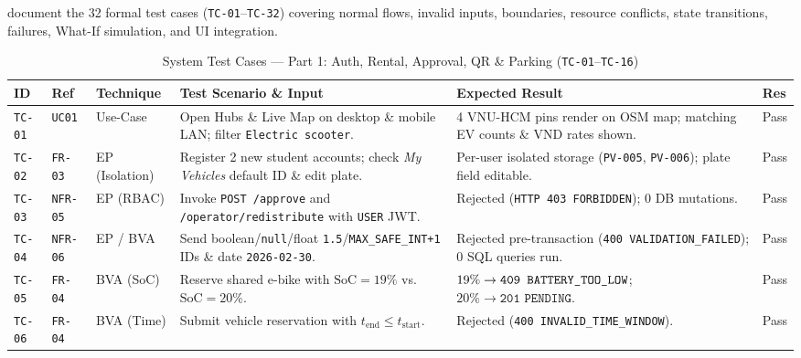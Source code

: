 \label{subsec:test-cases}
 document the 32 formal test cases (\texttt{TC-01}--\texttt{TC-32}) covering normal flows, invalid inputs, boundaries, resource conflicts, state transitions, failures, What-If simulation, and UI integration.

\begin{table}[H]
  \centering
  \singlespacing\scriptsize
  \caption{System Test Cases --- Part 1: Auth, Rental, Approval, QR \& Parking (\texttt{TC-01}--\texttt{TC-16})}
  \label{tab:tc-part1}
  \renewcommand{\arraystretch}{1.20}
  \begin{tabularx}{\textwidth}{|C{1.25cm}|C{1.40cm}|L{1.95cm}|Y|L{3.95cm}|C{0.95cm}|}
    \hline
    \textbf{ID} & \textbf{Ref} & \textbf{Technique} & \textbf{Test Scenario \& Input} & \textbf{Expected Result} & \textbf{Res} \\
    \hline
    \texttt{TC-01} & \texttt{UC01} & Use-Case & Open Hubs \& Live Map on desktop \& mobile LAN; filter \texttt{Electric scooter}. & 4 VNU-HCM pins render on OSM map; matching EV counts \& VND rates shown. & Pass \\
    \hline
    \texttt{TC-02} & \texttt{FR-03} & EP (Isolation) & Register 2 new student accounts; check \textit{My Vehicles} default ID \& edit plate. & Per-user isolated storage (\texttt{PV-005}, \texttt{PV-006}); plate field editable. & Pass \\
    \hline
    \texttt{TC-03} & \texttt{NFR-05} & EP (RBAC) & Invoke \texttt{POST /approve} and \texttt{/operator/\allowbreak redistribute} with \texttt{USER} JWT. & Rejected (\texttt{HTTP 403 FORBIDDEN}); 0 DB mutations. & Pass \\
    \hline
    \texttt{TC-04} & \texttt{NFR-06} & EP / BVA & Send boolean/\texttt{null}/float \texttt{1.5}/\texttt{MAX\_\allowbreak SAFE\_\allowbreak INT+1} IDs \& date \texttt{2026-02-30}. & Rejected pre-transaction (\texttt{400 VALIDATION\_\allowbreak FAILED}); 0 SQL queries run. & Pass \\
    \hline
    \texttt{TC-05} & \texttt{FR-04} & BVA (SoC) & Reserve shared e-bike with $\text{SoC}=19\%$ vs.\ $\text{SoC}=20\%$. & $19\% \rightarrow \texttt{409 BATTERY\_\allowbreak TOO\_\allowbreak LOW}$; $20\% \rightarrow \texttt{201 PENDING}$. & Pass \\
    \hline
    \texttt{TC-06} & \texttt{FR-04} & BVA (Time) & Submit vehicle reservation with $t_{\text{end}} \le t_{\text{start}}$. & Rejected (\texttt{400 INVALID\_\allowbreak TIME\_\allowbreak WINDOW}). & Pass \\

\end{tabularx}
\end{table}
